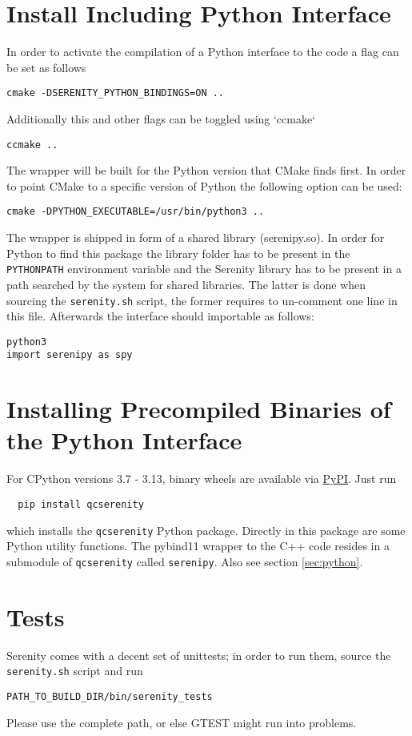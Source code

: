 \section{Install Including Python Interface}
In order to activate the compilation of a Python interface to the code
a flag can be set as follows
\begin{lstlisting}
cmake -DSERENITY_PYTHON_BINDINGS=ON ..
\end{lstlisting}
Additionally this and other flags can be toggled using `ccmake`
\begin{lstlisting}
ccmake ..
\end{lstlisting}
The wrapper will be built for the Python version that CMake finds first.
In order to point CMake to a specific version of Python the following
option can be used:
\begin{lstlisting}
cmake -DPYTHON_EXECUTABLE=/usr/bin/python3 ..
\end{lstlisting}
The wrapper is shipped in form of a shared library (serenipy.so).
In order for Python to find this package the library folder has to be present
in the \texttt{PYTHONPATH} environment variable and the Serenity library has to be
present in a path searched by the system for shared libraries.
The latter is done when sourcing the \texttt{serenity.sh} script, the former requires
to un-comment one line in this file.
Afterwards the interface should importable as follows:
\begin{lstlisting}
python3
import serenipy as spy
\end{lstlisting}

\section{Installing Precompiled Binaries of the Python Interface}
  For CPython versions 3.7 - 3.13, binary wheels are available via \href{https://pypi.org/project/qcserenity/}{PyPI}. Just run
  \begin{lstlisting}
  pip install qcserenity
  \end{lstlisting}
  
  which installs the \texttt{qcserenity} Python package. Directly in this package are some Python utility functions. The pybind11 wrapper to the C++ code resides in a submodule of \texttt{qcserenity} called \texttt{serenipy}. Also see section \ref{sec:python}.

\section{Tests}
Serenity comes with a decent set of unittests; in order to run them, source
the \texttt{serenity.sh} script and run
\begin{lstlisting}
PATH_TO_BUILD_DIR/bin/serenity_tests
\end{lstlisting}
Please use the complete path, or else GTEST might run into problems.


